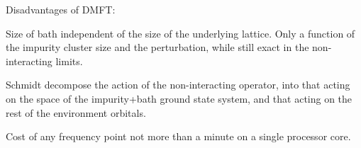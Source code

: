 \documentclass[aps,showpacs,twocolumn,nobibnotes]{revtex4}
\begin{document}
Disadvantages of DMFT:

Size of bath independent of the size of the underlying lattice. Only a function of the impurity cluster size and the perturbation, while still exact in the non-interacting limits.

Schmidt decompose the action of the non-interacting operator, into that acting on the space of the impurity+bath ground state system, and that acting on the rest of the environment orbitals.

Cost of any frequency point not more than a minute on a single processor core.

%
\end{document}
